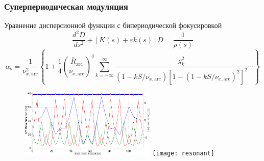 \begin{frame}
	\frametitle{Суперпериодическая модуляция}
     Уравнение дисперсионной функции с бипериодической фокусировкой
         \small \begin{equation}
	   \frac{d^2D}{ds^2}+\left[K(s)+\varepsilon k(s)\right]D=\frac{1}{\rho(s)}
	 \end{equation} \normalsize 	
\small \begin{equation}
\alpha_{\text{s}}=\frac{1}{\nu^2_{x, \text {arc}}}\left\{1+\frac{1}{4}\left(\frac{\bar{R}_{\text {arc}}}{\nu_{x, \text {arc}}}\right)^4 \sum_{k=-\infty}^{\infty} \frac{g^2_k}{\left(1-k S / \nu_{x, \text {arc}}\right)\left[1-\left(1-k S / \nu_{x, \text {arc}}\right)^2\right]^2} \cdots\right\}
\end{equation} \normalsize 	
	\begin{figure}[h!]
		\includegraphics[width=6.5cm]{images/resonant_arc}
		\texttt{[image: resonant]}
                \label{Figure 1}
	\end{figure}
	
	                
	

	 
\end{frame}
